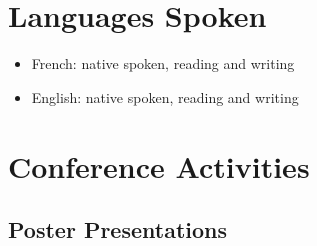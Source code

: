 \documentclass[letterpaper]{twentysecondcv} %
\begin{document}
\section{Languages Spoken}

\begin{itemize}
	\item French: native spoken, reading and writing
	\item English: native spoken, reading and writing
\end{itemize}


\newpage %
\makeprofile %


\section{Conference Activities}

\subsection{Poster Presentations}
\end{document}
